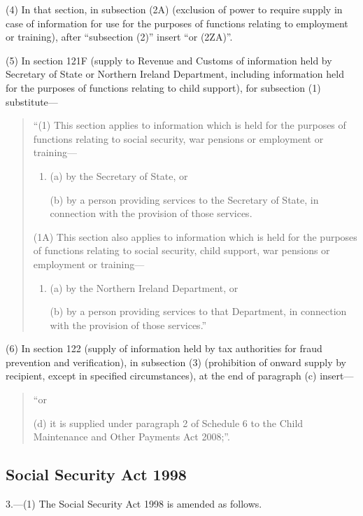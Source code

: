 \documentclass[a4paper]{article}
\begin{document}
(4) In that section, in subsection (2A) (exclusion of power to require supply in case of information for use for the purposes of functions relating to employment or training), after “subsection (2)” insert  “or (2ZA)”.

(5) In section 121F (supply to Revenue and Customs of information held by Secretary of State or Northern Ireland Department, including information held for the purposes of functions relating to child support), for subsection (1) substitute—
\begin{quotation}
“(1) This section applies to information which is held for the purposes of functions relating to social security, war pensions or employment or training—
\begin{enumerate}\item[]
(a) by the Secretary of State, or

(b) by a person providing services to the Secretary of State, in connection with the provision of those services.
\end{enumerate}

(1A) This section also applies to information which is held for the purposes of functions relating to social security, child support, war pensions or employment or training—
\begin{enumerate}\item[]
(a) by the Northern Ireland Department, or

(b) by a person providing services to that Department, in connection with the provision of 
those services.”
\end{enumerate}
\end{quotation}

(6) In section 122 (supply of information held by tax authorities for fraud prevention and verification), in subsection (3) (prohibition of onward supply by recipient, except in specified circumstances), at the end of paragraph (c) insert---
\begin{quotation}
 “or

 (d) it is supplied under paragraph 2 of Schedule 6 to the Child Maintenance and Other Payments Act 2008;”.
\end{quotation}

\subsection*{Social Security Act 1998}

3.---(1) The Social Security Act 1998 is amended as follows.
\end{document}
